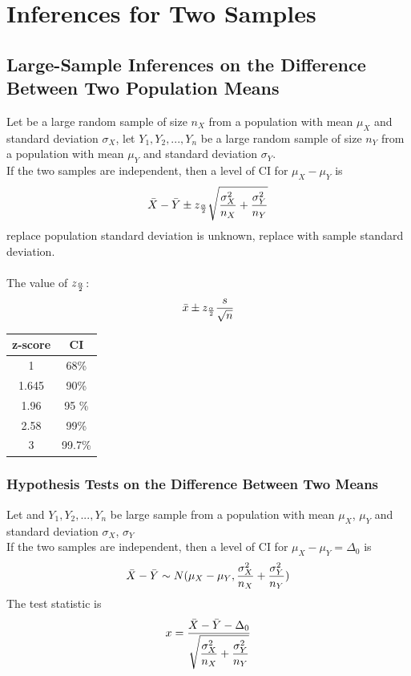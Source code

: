 \documentclass[../main.tex]{subfiles}
\begin{document}
\section{Inferences for Two Samples}

\subsection{Large-Sample Inferences on the Difference Between Two Population Means}
Let \xotn be a large random sample of size $n_X$ from a population with mean $\mu_X$ and standard deviation $\sigma_X$, let $Y_1, Y_2,...,Y_n$ be a large random sample of size $n_Y$ from a population with mean $\mu_Y$ and standard deviation $\sigma_Y$.\\
If the two samples are independent, then a level of \cia CI for $\mu_X-\mu_Y$ is
\begin{equation*}
    \bar{X}-\bar{Y} \pm z_{\frac{\alpha}{2}} \sqrt{\frac{\sigma_X^2}{n_X}+\frac{\sigma_Y^2}{n_Y}}
\end{equation*}
replace population standard deviation is unknown, replace with sample standard deviation.\\
\\
The value of $z_{\frac{\alpha}{2}}$:
$$\bar{x}\pm z_{\frac{\alpha}{2}} \frac{s}{\sqrt{n}}$$
\begin{center}
\begin{tabular}{ |c|c| } 
 \hline
 z-score & CI \\ 
 \hline
 1 & 68\% \\ 
 1.645 & 90\% \\ 
 1.96 & 95 \% \\
 2.58 & 99\% \\
 3 & 99.7\% \\
 \hline
\end{tabular}
\end{center}

\subsubsection*{Hypothesis Tests on the Difference Between Two Means}
Let \xotn and $Y_1, Y_2,...,Y_n$ be large sample from a population with mean $\mu_X$, $\mu_Y$ and standard deviation $\sigma_X$, $\sigma_Y$\\ 
If the two samples are independent, then a level of \cia CI for $\mu_X-\mu_Y=\Delta_0$ is
\begin{equation*}
    \bar{X}-\bar{Y} \sim  N( \mu_X-\mu_Y , {\frac{\sigma_X^2}{n_X}+\frac{\sigma_Y^2}{n_Y}})
\end{equation*}
The test statistic is 
\begin{equation*}
    x =  \frac{\bar{X}-\bar{Y}-\Delta_0}{\displaystyle \sqrt{\frac{\sigma_X^2}{n_X}+\frac{\sigma_Y^2}{n_Y}}}
\end{equation*}
\end{document}
